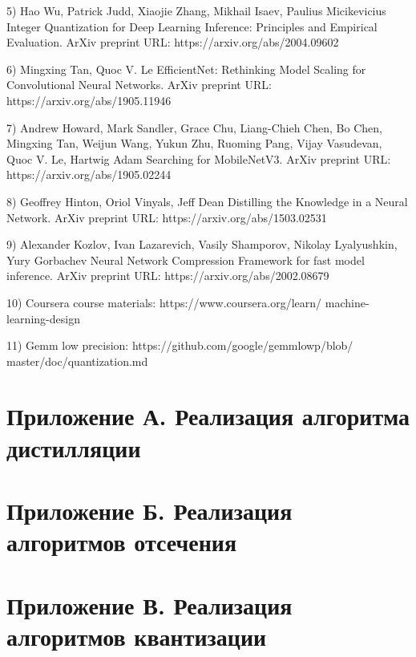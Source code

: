 \documentclass[oneside,final,12pt]{extreport}
\begin{document}
5) Hao Wu, Patrick Judd, Xiaojie Zhang, Mikhail Isaev, Paulius Micikevicius Integer Quantization for Deep Learning Inference: Principles and Empirical Evaluation. ArXiv preprint URL: https://arxiv.org/abs/2004.09602

6) Mingxing Tan, Quoc V. Le EfficientNet: Rethinking Model Scaling for Convolutional Neural Networks.  ArXiv preprint URL: https://arxiv.org/abs/1905.11946

7) Andrew Howard, Mark Sandler, Grace Chu, Liang-Chieh Chen, Bo Chen, Mingxing Tan, Weijun Wang, Yukun Zhu, Ruoming Pang, Vijay Vasudevan, Quoc V. Le, Hartwig Adam Searching for MobileNetV3. ArXiv preprint URL: https://arxiv.org/abs/1905.02244

8) Geoffrey Hinton, Oriol Vinyals, Jeff Dean Distilling the Knowledge in a Neural Network. ArXiv preprint URL: https://arxiv.org/abs/1503.02531

9)  Alexander Kozlov, Ivan Lazarevich, Vasily Shamporov, Nikolay Lyalyushkin, Yury Gorbachev Neural Network Compression Framework for fast model inference. ArXiv preprint URL: https://arxiv.org/abs/2002.08679

10) Coursera course materials: https://www.coursera.org/learn/ machine-learning-design

11) Gemm low precision: https://github.com/google/gemmlowp/blob/ master/doc/quantization.md

\chapter{Приложение А. Реализация алгоритма дистилляции}

\chapter{Приложение Б. Реализация алгоритмов отсечения}

\chapter{Приложение В. Реализация алгоритмов квантизации}
\end{document}
